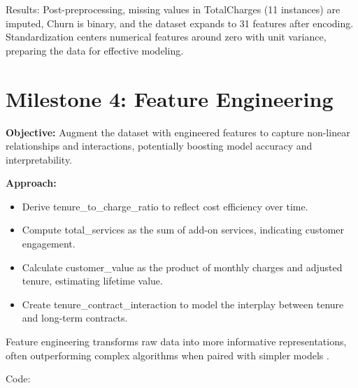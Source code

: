 \documentclass[preprint, 3p,
authoryear]{elsarticle} %
\providecommand{\tightlist}{%
  \setlength{\itemsep}{0pt}\setlength{\parskip}{0pt}}
\begin{document}
Results: Post-preprocessing, missing values in TotalCharges (11
instances) are imputed, Churn is binary, and the dataset expands to 31
features after encoding. Standardization centers numerical features
around zero with unit variance, preparing the data for effective
modeling.

\section{Milestone 4: Feature
Engineering}\label{milestone-4-feature-engineering}

\textbf{Objective:} Augment the dataset with engineered features to
capture non-linear relationships and interactions, potentially boosting
model accuracy and interpretability.

\textbf{Approach:}

\begin{itemize}
\tightlist
\item
  Derive tenure\_to\_charge\_ratio to reflect cost efficiency over time.
\item
  Compute total\_services as the sum of add-on services, indicating
  customer engagement.
\item
  Calculate customer\_value as the product of monthly charges and
  adjusted tenure, estimating lifetime value.
\item
  Create tenure\_contract\_interaction to model the interplay between
  tenure and long-term contracts.
\end{itemize}

Feature engineering transforms raw data into more informative
representations, often outperforming complex algorithms when paired with
simpler models \citep{nargesian2017learning}.

Code:
\end{document}
